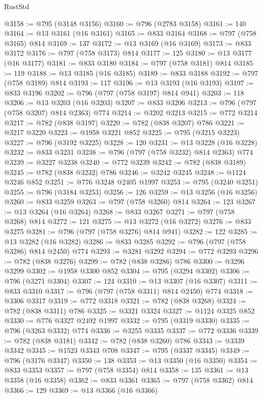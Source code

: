 \begin{lexlean}{RustStd}
\begin{coremodule}
@3158 := @795 (@3148 @3156)
@3160 := @796 (@2783 @3158)
@3161 := 140
@3164 := @13 @3161 (@16 @3161)
@3165 := @833 @3164
@3168 := @797 (@758 @3165) @814
@3169 := 137
@3172 := @13 @3169 (@16 @3169)
@3173 := @833 @3172
@3176 := @797 (@758 @3173) @814
@3177 := 125
@3180 := @13 @3177 (@16 @3177)
@3181 := @833 @3180
@3184 := @797 (@758 @3181) @814
@3185 := 119
@3188 := @13 @3185 (@16 @3185)
@3189 := @833 @3188
@3192 := @797 (@758 @3189) @814
@3193 := 117
@3196 := @13 @3193 (@16 @3193)
@3197 := @833 @3196
@3202 := @796 (@797 (@758 @3197) @814 @941)
@3203 := 118
@3206 := @13 @3203 (@16 @3203)
@3207 := @833 @3206
@3213 := @796 (@797 (@758 @3207) @814 @2363) @774
@3214 := @3202 @3213
@3215 := @772 @3214
@3217 := @782 (@838 @3197)
@3220 := @782 (@838 @3207) @786
@3221 := @3217 @3220
@3223 := @1958 @3221 @852
@3225 := @795 (@3215 @3223)
@3227 := @796 (@3192 @3225)
@3228 := 120
@3231 := @13 @3228 (@16 @3228)
@3232 := @833 @3231
@3238 := @796 (@797 (@758 @3232) @814 @2363) @774
@3239 := @3227 @3238
@3240 := @772 @3239
@3242 := @782 (@838 @3189)
@3245 := @782 (@838 @3232) @786
@3246 := @3242 @3245
@3248 := @1124 @3246 @852
@3251 := @776 @3248 @2405 @1997
@3253 := @795 (@3240 @3251)
@3255 := @796 (@3184 @3253)
@3256 := 126
@3259 := @13 @3256 (@16 @3256)
@3260 := @833 @3259
@3263 := @797 (@758 @3260) @814
@3264 := 123
@3267 := @13 @3264 (@16 @3264)
@3268 := @833 @3267
@3271 := @797 (@758 @3268) @814
@3272 := 121
@3275 := @13 @3272 (@16 @3272)
@3276 := @833 @3275
@3281 := @796 (@797 (@758 @3276) @814 @941)
@3282 := 122
@3285 := @13 @3282 (@16 @3282)
@3286 := @833 @3285
@3292 := @796 (@797 (@758 @3286) @814 @2450) @774
@3293 := @3281 @3292
@3294 := @772 @3293
@3296 := @782 (@838 @3276)
@3299 := @782 (@838 @3286) @786
@3300 := @3296 @3299
@3302 := @1958 @3300 @852
@3304 := @795 (@3294 @3302)
@3306 := @796 (@3271 @3304)
@3307 := 124
@3310 := @13 @3307 (@16 @3307)
@3311 := @833 @3310
@3317 := @796 (@797 (@758 @3311) @814 @2450) @774
@3318 := @3306 @3317
@3319 := @772 @3318
@3321 := @782 (@838 @3268)
@3324 := @782 (@838 @3311) @786
@3325 := @3321 @3324
@3327 := @1124 @3325 @852
@3330 := @776 @3327 @2492 @1997
@3332 := @795 (@3319 @3330)
@3335 := @796 (@3263 @3332) @774
@3336 := @3255 @3335
@3337 := @772 @3336
@3339 := @782 (@838 @3181)
@3342 := @782 (@838 @3260) @786
@3343 := @3339 @3342
@3345 := @1523 @3343 @708
@3347 := @795 (@3337 @3345)
@3349 := @796 (@3176 @3347)
@3350 := 138
@3353 := @13 @3350 (@16 @3350)
@3354 := @833 @3353
@3357 := @797 (@758 @3354) @814
@3358 := 135
@3361 := @13 @3358 (@16 @3358)
@3362 := @833 @3361
@3365 := @797 (@758 @3362) @814
@3366 := 129
@3369 := @13 @3366 (@16 @3366)

\end{coremodule}
\end{lexlean}
